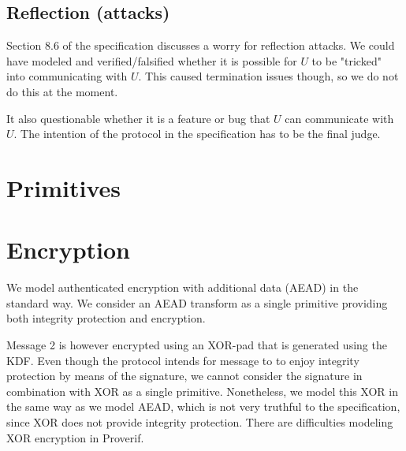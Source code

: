 \documentclass[a4paper,11pt]{article}
\theoremstyle{plain}
\theoremstyle{plain}
\begin{document}
\subsection{Reflection (attacks)}
Section 8.6 of the specification discusses a worry for reflection attacks.
%
We could have modeled and verified/falsified whether it is possible for
$U$ to be "tricked" into communicating with $U$.
%
This caused termination issues though, so we do not do this at the moment.
%

It also questionable whether it is a feature or bug that $U$ can communicate
with $U$.
%
The intention of the protocol in the specification has to be the final judge.
%

\section{Primitives}
\section{Encryption}
%
We model authenticated encryption with additional data (AEAD) in the standard
way.
%
We consider an AEAD transform as a single primitive providing both integrity
protection and encryption.
%

Message 2 is however encrypted using an XOR-pad that is generated using the KDF.
%
Even though the protocol intends for message to to enjoy integrity protection by
means of the signature, we cannot consider the signature in combination with
XOR as a single primitive.
%
Nonetheless, we model this XOR in the same way as we model AEAD, which is not very truthful
to the specification, since XOR does not provide integrity protection.
%
There are difficulties modeling XOR encryption in Proverif.
%


%
%

\end{document}
